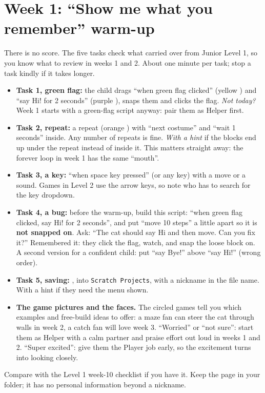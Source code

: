 \section{Week 1: \enquote{Show me what you remember} warm-up}
There is no score. The five tasks check what carried over from Junior Level 1, so you know what to
review in weeks 1 and 2. About one minute per task; stop a task kindly if it takes longer.

\begin{itemize}[itemsep=2pt]
  \item \textbf{Task 1, green flag:} the child drags \enquote{when green flag clicked} (yellow
        ) and \enquote{say Hi! for 2 seconds} (purple ), snaps them and clicks
        the flag. \emph{Not today?} Week 1 starts with a green-flag script anyway: pair them as Helper first.
  \item \textbf{Task 2, repeat:} a repeat (orange ) with \enquote{next costume} and
        \enquote{wait 1 seconds} inside. Any number of repeats is fine. \emph{With a hint} if the
        blocks end up under the repeat instead of inside it. This matters straight away: the forever
        loop in week 1 has the same \enquote{mouth}.
  \item \textbf{Task 3, a key:} \enquote{when space key pressed} (or any key) with a move or a sound.
        Games in Level 2 use the arrow keys, so note who has to search for the key dropdown.
  \item \textbf{Task 4, a bug:} before the warm-up, build this script: \enquote{when green flag clicked,
        say Hi! for 2 seconds}, and put \enquote{move 10 steps} a little apart so it is \textbf{not snapped
        on}. Ask: \enquote{The cat should say Hi and then move. Can you fix it?} Remembered it: they click
        the flag, watch, and snap the loose block on. A second version for a confident child: put
        \enquote{say Bye!} above \enquote{say Hi!} (wrong order).
  \item \textbf{Task 5, saving:} , into \texttt{Scratch Projects},
        with a nickname in the file name. With a hint if they need the menu shown.
  \item \textbf{The game pictures and the faces.} The circled games tell you which examples and
        free-build ideas to offer: a maze fan can steer the cat through walls in week 2, a catch fan
        will love week 3. \enquote{Worried} or \enquote{not sure}: start them as Helper with a calm
        partner and praise effort out loud in weeks 1 and 2. \enquote{Super excited}: give them the
        Player job early, so the excitement turns into looking closely.
\end{itemize}
Compare with the Level 1 week-10 checklist if you have it. Keep the page in your folder; it has no
personal information beyond a nickname.

